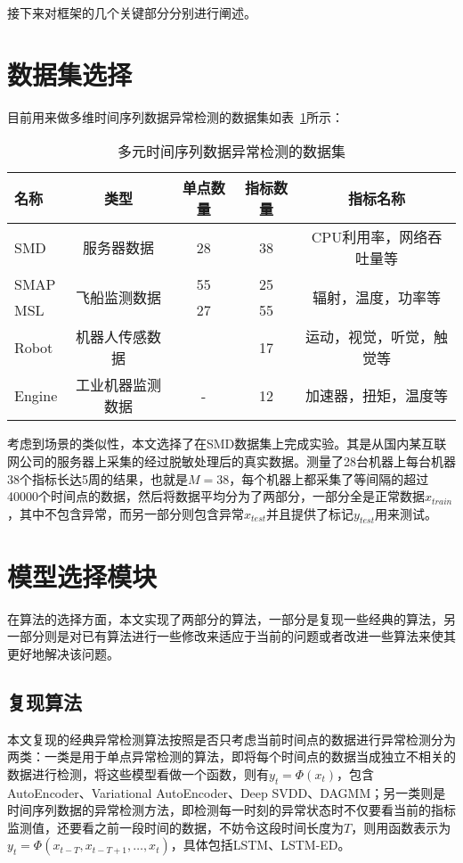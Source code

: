 接下来对框架的几个关键部分分别进行阐述。
\section{数据集选择}
目前用来做多维时间序列数据异常检测的数据集如表~\ref{tab:dataset}所示：

\begin{table}[htbp]
  \centering
  \begin{tabular}{lcccc}
    \toprule
    名称 & 类型 & 单点数量 & 指标数量  & 指标名称 \\
    \midrule
    SMD\cite{su2019robust} & 服务器数据 & 28 & 38 & CPU利用率，网络吞吐量等\\
    SMAP\cite{DBLP:conf/kdd/HundmanCLCS18} & \multirow{2}{*}{飞船监测数据} & 55 & 25 & \multirow{2}{*}{辐射，温度，功率等}\\
    MSL\cite{DBLP:conf/kdd/HundmanCLCS18} &  & 27 & 55 &  \\
    Robot\cite{park2018multimodal} & 机器人传感数据 & \approx 39 & 17 & 运动，视觉，听觉，触觉等\\
    Engine\cite{malhotra2016lstm} &工业机器监测数据 & - & 12 & 加速器，扭矩，温度等\\
    \bottomrule
  \end{tabular}
  \caption{多元时间序列数据异常检测的数据集\cite{su2019robust}}
  \label{tab:dataset}
\end{table}

考虑到场景的类似性，本文选择了在SMD\cite{su2019robust}数据集上完成实验。其是从国内某互联网公司的服务器上采集的经过脱敏处理后的真实数据。测量了28台机器上每台机器38个指标长达5周的结果，也就是$M=38$，每个机器上都采集了等间隔的超过40000个时间点的数据，然后将数据平均分为了两部分，一部分全是正常数据$x_{train}$，其中不包含异常，而另一部分则包含异常$x_{test}$并且提供了标记$y_{test}$用来测试。

\section{模型选择模块}
\label{sec:model:select}
在算法的选择方面，本文实现了两部分的算法，一部分是复现一些经典的算法，另一部分则是对已有算法进行一些修改来适应于当前的问题或者改进一些算法来使其更好地解决该问题。
\subsection{复现算法}
本文复现的经典异常检测算法按照是否只考虑当前时间点的数据进行异常检测分为两类：一类是用于单点异常检测的算法，即将每个时间点的数据当成独立不相关的数据进行检测，将这些模型看做一个函数，则有$y_t = \Phi (x_t)$，包含AutoEncoder、Variational AutoEncoder\cite{an2015variational}、Deep SVDD\cite{ruff2018deep}、DAGMM\cite{zong2018deep}；另一类则是时间序列数据的异常检测方法，即检测每一时刻的异常状态时不仅要看当前的指标监测值，还要看之前一段时间的数据，不妨令这段时间长度为$T$，则用函数表示为$y_t = \Phi(x_{t-T},x_{t-T+1},\dots,x_{t})$，具体包括LSTM、LSTM-ED\cite{malhotra2016lstm}。

